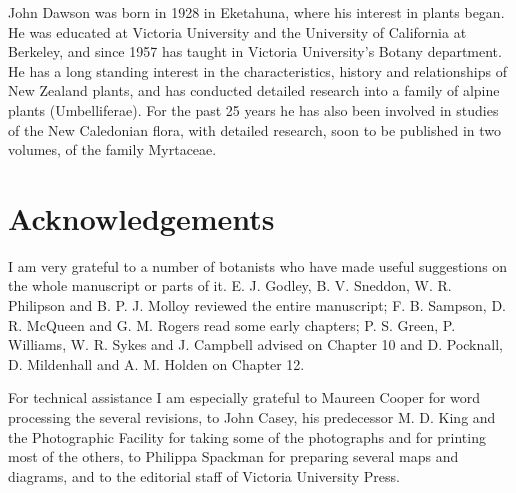 John Dawson was born in 1928 in Eketahuna, where his interest in plants began.
He was educated at Victoria University and the University of California at Berkeley, and since 1957 has taught in Victoria University's Botany department.
He has a long standing interest in the characteristics, history and relationships of New Zealand plants, and has conducted detailed research into a family of alpine plants (Umbelliferae).
For the past 25 years he has also been involved in studies of the New Caledonian flora, with detailed research, soon to be published in two volumes, of the family Myrtaceae.

\chapter*{Acknowledgements}

I am very grateful to a number of botanists who have made useful suggestions on the whole manuscript or parts of it.
E. J. Godley, B. V. Sneddon, W. R. Philipson and B. P. J. Molloy reviewed the entire manuscript; F. B. Sampson, D. R. McQueen and G. M. Rogers read some early chapters; P. S. Green, P. Williams, W. R. Sykes and J. Campbell advised on Chapter 10 and D. Pocknall, D. Mildenhall and A. M. Holden on Chapter 12.

For technical assistance I am especially grateful to Maureen Cooper for word processing the several revisions, to John Casey, his predecessor M. D. King and the Photographic Facility for taking some of the photographs and for printing most of the others, to Philippa Spackman for preparing several maps and diagrams, and to the editorial staff of Victoria University Press.
